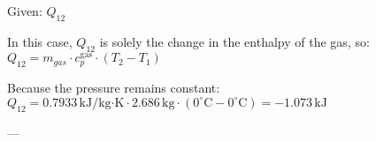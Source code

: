 Given: \( Q_{12} \)  

In this case, \( Q_{12} \) is solely the change in the enthalpy of the gas, so:  
\( Q_{12} = m_{gas} \cdot c_{p}^{\text{gas}} \cdot (T_{2} - T_{1}) \)  

Because the pressure remains constant:  
\( Q_{12} = 0.7933 \, \text{kJ/kg·K} \cdot 2.686 \, \text{kg} \cdot (0^\circ \text{C} - 0^\circ \text{C}) = -1.073 \, \text{kJ} \)  

---